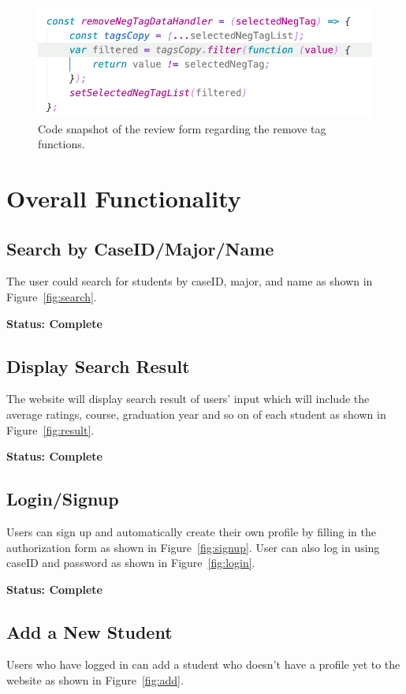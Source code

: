 \documentclass[12pt]{article}
\begin{document}
\begin{figure}[h]
    \centering
    \label{fig:remtag}
    \includegraphics[scale=0.6]{remove-tag.png}
    \caption{Code snapshot of the review form regarding the remove tag functions.}
\end{figure}

\section{Overall Functionality}
\subsection{Search by CaseID/Major/Name}
The user could search for students by caseID, major, and name as shown in Figure~\ref{fig:search}.

\textbf{Status: Complete}

\subsection{Display Search Result}
The website will display search result of users' input which will include the average ratings, course, graduation year and so on of each student 
as shown in Figure~\ref{fig:result}.

\textbf{Status: Complete}

\subsection{Login/Signup}
Users can sign up and automatically create their own profile by filling in the authorization form as shown in Figure~\ref{fig:signup}. 
User can also log in using caseID and password as shown in Figure~\ref{fig:login}. 

\textbf{Status: Complete}

\subsection{Add a New Student}
Users who have logged in can add a student who doesn't have a profile yet to the website as shown in Figure~\ref{fig:add}.
\end{document}
